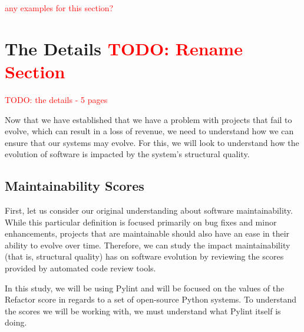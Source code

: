 \documentclass[12pt,conference]{IEEEtran}
\newcommand\todo[1]{\textcolor{red}{#1}}
\begin{document}
\todo{any examples for this section?}


\section{The Details \todo{TODO: Rename Section}}
\todo{TODO: the details - 5 pages}


Now that we have established that we have a problem with projects that fail to evolve, which can result in a loss of revenue, we need to understand how we can ensure that our systems may evolve. For this, we will look to understand how the evolution of software is impacted by the system's structural quality.

\subsection{Maintainability Scores} \label{sectionMaintainabilityScores}


First, let us consider our original understanding about software maintainability. While this particular definition is focused primarily on bug fixes and minor enhancements, projects that are maintainable should also have an ease in their ability to evolve over time. Therefore, we can study the impact maintainability (that is, structural quality) has on software evolution by reviewing the scores provided by automated code review tools.

In this study, we will be using Pylint and will be focused on the values of the Refactor score in regards to a set of open-source Python systems. To understand the scores we will be working with, we must understand what Pylint itself is doing. 
\end{document}
